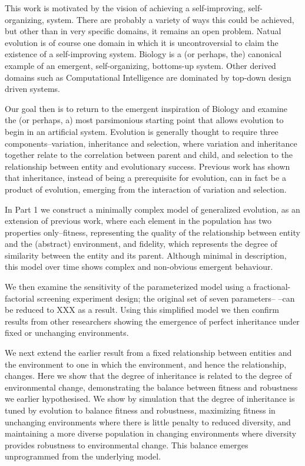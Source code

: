 \documentclass[]{report}
\title{}
\author{}
\begin{document}
This work is motivated by the vision of achieving a self-improving, self-organizing, system. There are probably a variety of ways this could be achieved, but other than in very specific domains, it remains an open problem. Natual evolution is of course one domain in which it is uncontroversial to claim the existence of a self-improving system. Biology is a (or perhaps, the) canonical example of an emergent, self-organizing, bottoms-up system. Other derived domains such as Computational Intelligence are dominated by top-down design driven systems.

Our goal then is to return to the emergent inspiration of Biology and examine the (or perhaps, a) most parsimonious starting point that allows evolution to begin in an artificial system. Evolution is generally thought to require three components--variation, inheritance and selection, where variation and inheritance together relate to the correlation between parent and child, and selection to the relationship between entity and evolutionary success. Previous work has shown that inheritance, instead of being a prerequisite for evolution, can in fact be a product of evolution, emerging from the interaction of variation and selection.


In Part 1 we construct a minimally complex model of generalized evolution, as an extension of previous work, where each element in the population has two properties only--fitness, representing the quality of the relationship between entity and the (abstract) environment, and fidelity, which represents the degree of similarity between the entity and its parent. Although minimal in description, this model over time shows complex and non-obvious emergent behaviour.

We then examine the sensitivity of the parameterized model using a fractional-factorial screening experiment design; the original set of seven parameters-- --can be reduced to XXX as a result. Using this simplified model we then confirm results from other researchers showing the emergence of perfect inheritance under fixed or unchanging environments.

We next extend the earlier result from a fixed relationship between entities and the environment to one in which the environment, and hence the relationship, changes. Here we show that the degree of inheritance is related to the degree of environmental change, demonstrating the balance between fitness and robustness we earlier hypothesised. We show by simulation that the degree of inheritance is tuned by evolution to balance fitness and robustness, maximizing fitness in unchanging environments where there is little penalty to reduced diversity, and maintaining a more diverse population in changing environments where diversity provides robustness to environmental change. This balance emerges unprogrammed from the underlying model.
\end{document}
